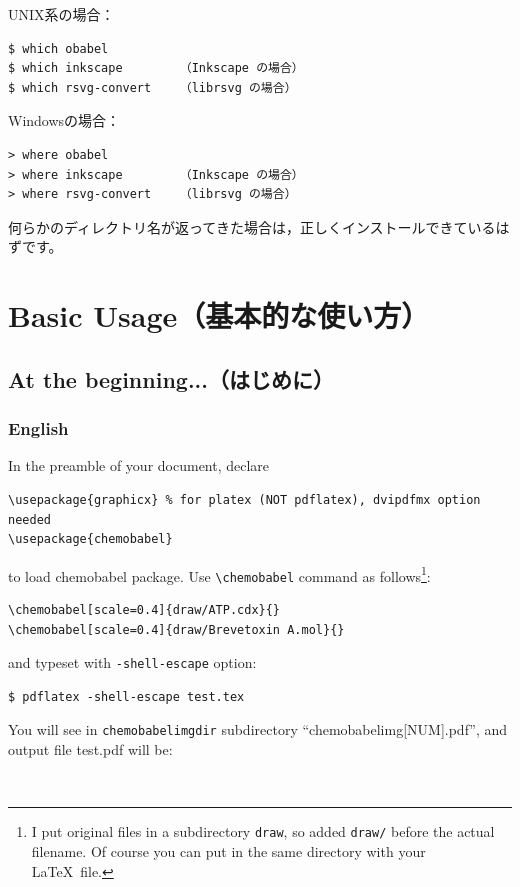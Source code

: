 \documentclass[dvipdfmx,12pt]{jsarticle}
\begin{document}
UNIX系の場合：
\begin{verbatim}
$ which obabel
$ which inkscape        （Inkscape の場合）
$ which rsvg-convert    （librsvg の場合）
\end{verbatim}

Windowsの場合：
\begin{verbatim}
> where obabel
> where inkscape        （Inkscape の場合）
> where rsvg-convert    （librsvg の場合）
\end{verbatim}

何らかのディレクトリ名が返ってきた場合は，正しくインストールできているはずです。

\clearpage

\section{Basic Usage（基本的な使い方）} \label{basic}

\subsection{At the beginning...（はじめに）}

\subsubsection{English}
In the preamble of your document, declare
\begin{verbatim}
\usepackage{graphicx} % for platex (NOT pdflatex), dvipdfmx option needed
\usepackage{chemobabel}
\end{verbatim}
to load \textsf{chemobabel} package.
Use \verb|\chemobabel| command as follows\footnote{I put original files
in a subdirectory \texttt{draw}, so added \texttt{draw/} before the actual
filename. Of course you can put in the same directory with your \LaTeX\ file.}:
\begin{verbatim}
\chemobabel[scale=0.4]{draw/ATP.cdx}{}
\chemobabel[scale=0.4]{draw/Brevetoxin A.mol}{}
\end{verbatim}
and typeset with \verb|-shell-escape| option:
\begin{verbatim}
$ pdflatex -shell-escape test.tex
\end{verbatim}
You will see in \verb|chemobabelimgdir| subdirectory ``chemobabelimg[NUM].pdf'',
and output file test.pdf will be:
\begin{figure}[h]
  \centering
   \\
\end{figure}
\end{document}
